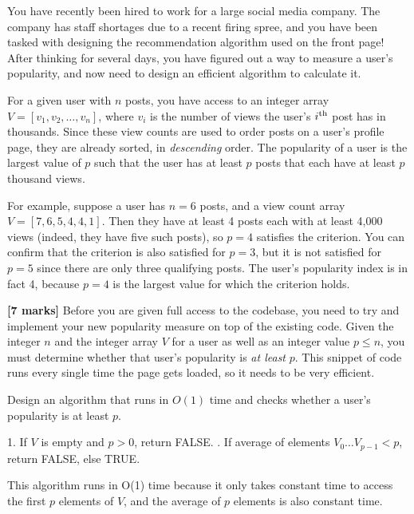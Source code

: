 \documentclass{article}
\begin{document}
\setcounter{question}{0}

\begin{Question}
You have recently been hired to work for a large social media company. The company has staff shortages due to a recent firing spree, and you have been tasked with designing the recommendation algorithm used on the front page! After thinking for several days, you have figured out a way to measure a user's popularity, and now need to design an efficient algorithm to calculate it.

For a given user with \(n\) posts, you have access to an integer array \(V = [v_1, v_2, \dots, v_n]\), where \(v_i\) is the number of views the user's \(i\textsuperscript{th}\) post has in thousands. Since these view counts are used to order posts on a user's profile page, they are already sorted, in \emph{descending} order. The popularity of a user is the largest value of \(p\) such that the user has at least \(p\) posts that each have at least \(p\) thousand views.

For example, suppose a user has \(n = 6\) posts, and a view count array \(V = [7, 6, 5, 4, 4, 1]\). Then they have at least 4 posts each with at least 4,000 views (indeed, they have five such posts), so \(p = 4\) satisfies the criterion. You can confirm that the criterion is also satisfied for \(p = 3\), but it is not satisfied for \(p = 5\) since there are only three qualifying posts. The user's popularity index is in fact 4, because \(p = 4\) is the largest value for which the criterion holds.

\begin{Subquestion}
\textbf{[7 marks]} Before you are given full access to the codebase, you need to try and implement your new popularity measure on top of the existing code. Given the integer \(n\) and the integer array \(V\) for a user as well as an integer value \(p \le n\), you must determine whether that user's popularity is \emph{at least} \(p\). This snippet of code runs every single time the page gets loaded, so it needs to be very efficient.

Design an algorithm that runs in \(O(1)\) time and checks whether a user's popularity is at least \(p\).

\begin{answer}

1. If \(V\) is empty and \(p > 0\), return FALSE. . If average of elements \(V_0 \dots V_{p-1} < p\), return FALSE, else TRUE.


This algorithm runs in O(1) time because it only takes constant time to access the first \(p\) elements of \(V\), and the average of \(p\) elements is also constant time.


\end{answer}
\end{Subquestion}
\end{Question}
\end{document}
